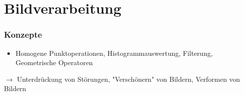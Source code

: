 %

\section{Bildverarbeitung}

\subsubsection*{Konzepte}

\begin{itemize}
\item Homogene Punktoperationen, Histogrammauswertung, Filterung, Geometrische Operatoren
\end{itemize}
$\to$ Unterdrückung von Störungen, "{}Verschönern"{} von Bildern, Verformen von Bildern

